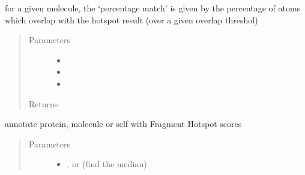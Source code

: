 \documentclass[letterpaper,10pt,english]{sphinxmanual}
\begin{document}
\begin{fulllineitems}
\begin{fulllineitems}
\begin{quote}
\begin{description}
\end{description}\end{quote}

\end{fulllineitems}


\begin{fulllineitems}
\label{\detokenize{result_api:hotspots.result.Results.percentage_matched_atoms}}
for a given molecule, the ‘percentage match’ is given by the percentage of atoms
which overlap with the hotspot result (over a given overlap threshol)
\begin{quote}\begin{description}
\item[{Parameters}] \leavevmode\begin{itemize}
\item {} 
 \textendash{} 

\item {} 
 \textendash{} 

\item {} 
 \textendash{} 

\end{itemize}

\item[{Returns}] \leavevmode


\end{description}\end{quote}

\end{fulllineitems}


\begin{fulllineitems}
\label{\detokenize{result_api:hotspots.result.Results.score}}
annotate protein, molecule or self with Fragment Hotspot scores
\begin{quote}\begin{description}
\item[{Parameters}] \leavevmode\begin{itemize}
\item {} 
 \textendash{} ,  or  (find the median)


\end{itemize}
\end{description}
\end{quote}
\end{fulllineitems}
\end{fulllineitems}
\end{document}
